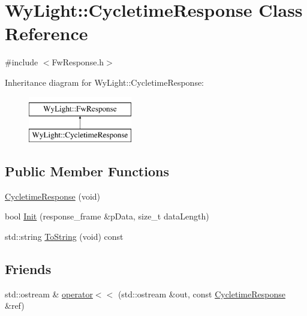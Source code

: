 \hypertarget{class_wy_light_1_1_cycletime_response}{\section{Wy\-Light\-:\-:Cycletime\-Response Class Reference}
\label{class_wy_light_1_1_cycletime_response}
}


{\ttfamily \#include $<$Fw\-Response.\-h$>$}

Inheritance diagram for Wy\-Light\-:\-:Cycletime\-Response\-:\begin{figure}[H]
\begin{center}
\leavevmode
\includegraphics[height=2.000000cm]{class_wy_light_1_1_cycletime_response}
\end{center}
\end{figure}
\subsection*{Public Member Functions}
\begin{DoxyCompactItemize}
\item 
\hyperlink{class_wy_light_1_1_cycletime_response_a188f5503b6ca936497135b764d1d1000}{Cycletime\-Response} (void)
\item 
bool \hyperlink{class_wy_light_1_1_cycletime_response_a44ddaaf66bed8086ad74f15d0c2d6c2a}{Init} (response\-\_\-frame \&p\-Data, size\-\_\-t data\-Length)
\item 
std\-::string \hyperlink{class_wy_light_1_1_cycletime_response_af031ea2856a93586431cda509f85b0f6}{To\-String} (void) const 
\end{DoxyCompactItemize}
\subsection*{Friends}
\begin{DoxyCompactItemize}
\item 
std\-::ostream \& \hyperlink{class_wy_light_1_1_cycletime_response_a297451ca9509cdee481811027a5e31a6}{operator$<$$<$} (std\-::ostream \&out, const \hyperlink{class_wy_light_1_1_cycletime_response}{Cycletime\-Response} \&ref)
\end{DoxyCompactItemize}



